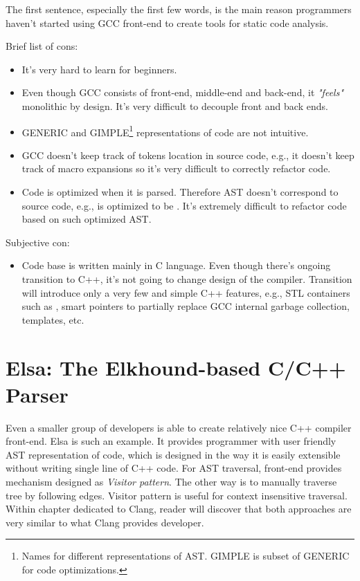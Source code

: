 The first sentence, especially the first few words, is the main reason programmers haven't started using GCC front-end to create tools for static code analysis.

Brief list of cons:

\begin{itemize}
\item It's very hard to learn for beginners.

\item Even though GCC consists of front-end, middle-end and back-end, it \textit{"feels"} monolithic by design. It's very difficult to decouple front and back ends.

\item GENERIC and GIMPLE\footnote{Names for different representations of AST. GIMPLE is subset of GENERIC for code optimizations.} representations of code are not intuitive.

\item GCC doesn't keep track of tokens location in source code, e.g., it doesn't keep track of macro expansions so it's very difficult to correctly refactor code.

\item Code is optimized when it is parsed. Therefore AST doesn't correspond to source code, e.g.,  is optimized to be . It's extremely difficult to refactor code based on such optimized AST.
\end{itemize}

Subjective con:

\begin{itemize}
\item Code base is written mainly in C language. Even though there's ongoing transition to C++, it's not going to change design of the compiler. Transition will introduce only a very few and simple C++ features, e.g., STL containers such as , smart pointers to partially replace GCC internal garbage collection, templates, etc.
\end{itemize}

\section{Elsa: The Elkhound-based C/C++ Parser}
Even a smaller group of developers is able to create relatively nice C++ compiler front-end. Elsa is such an example. It provides programmer with user friendly AST representation of code, which is designed in the way it is easily extensible without writing single line of C++ code. For AST traversal, front-end provides mechanism designed as \emph{Visitor pattern}. The other way is to manually traverse tree by following edges. Visitor pattern is useful for context insensitive traversal. Within chapter dedicated to Clang, reader will discover that both approaches are very similar to what Clang provides developer.

